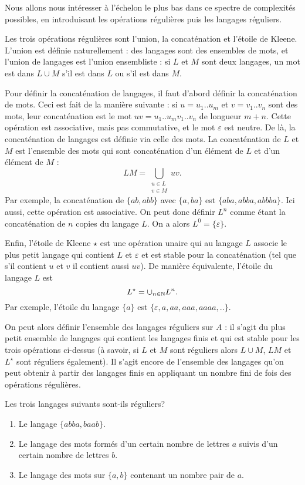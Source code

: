 Nous allons nous intéresser à l'échelon le plus bas dans ce spectre de complexités possibles, en introduisant les opérations régulières puis les langages réguliers.

Les trois opérations régulières sont l'union, la concaténation et l'étoile de Kleene.
L'union est définie naturellement : des langages sont des ensembles de mots, et l'union de langages est l'union ensembliste : si $L$ et $M$ sont deux langages, un mot est dans $L\cup M$ s'il est dans $L$ ou s'il est dans $M$.

Pour définir la concaténation de langages, il faut d'abord définir la concaténation de mots. Ceci est fait de la manière suivante : si $u=u_1..u_m$ et $v=v_1..v_n$ sont des mots, leur concaténation est le mot $uv=u_1..u_mv_1..v_n$ de longueur $m+n$. Cette opération est associative, mais pas commutative, et le mot $\varepsilon$ est neutre.
De là, la concaténation de langages est définie via celle des mots. La concaténation de $L$ et $M$ est l'ensemble des mots qui sont concaténation d'un élément de $L$ et d'un élément de $M$ : 
\[LM=\bigcup_{\substack{u\in L\\ v\in M}} uv.\]
Par exemple, la concaténation de $\{ab,abb\}$ avec $\{a,ba\}$ est $\{aba,abba,abbba\}$. Ici aussi, cette opération est associative. On peut donc définir $L^n$ comme étant la concaténation de $n$ copies du langage $L$. On a alors $L^0=\{\varepsilon\}$.

Enfin, l'étoile de Kleene $\star$ est une opération unaire qui au langage $L$ associe le plus petit langage qui contient $L$ et $\varepsilon$ et est stable pour la concaténation (tel que s'il contient $u$ et $v$ il contient aussi $uv$). De manière équivalente, l'étoile du langage $L$ est
\[L^\star=\cup_{n\in\mathbb N} L^n.\]
Par exemple, l'étoile du langage $\{a\}$ est $\{\varepsilon,a,aa,aaa,aaaa,..\}$.

On peut alors définir l'ensemble des langages réguliers sur $A$ : il s'agit du plus petit ensemble de langages qui contient les langages finis et qui est stable pour les trois opérations ci-dessus (à savoir, si $L$ et $M$ sont réguliers alors $L\cup M$, $LM$ et $L^\star$ sont réguliers également). Il s'agit encore de l'ensemble des langages qu'on peut obtenir à partir des langages finis en appliquant un nombre fini de fois des opérations régulières.

\begin{exo}
Les trois langages suivants sont-ils réguliers?
\begin{enumerate}
\item Le langage $\{abba,baab\}$.
\item Le langage des mots formés d'un certain nombre de lettres $a$ suivis d'un certain nombre de lettres $b$.
\item Le langage des mots sur $\{a,b\}$ contenant un nombre pair de $a$.
\end{enumerate}
\end{exo}

